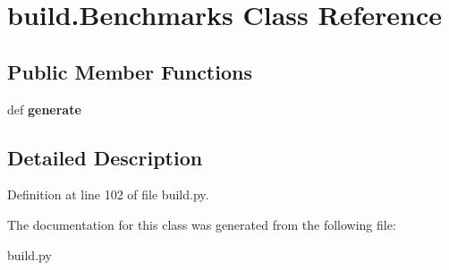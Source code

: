 \hypertarget{classbuild_1_1Benchmarks}{\section{build.\-Benchmarks \-Class \-Reference}
\label{classbuild_1_1Benchmarks}
}
\subsection*{\-Public \-Member \-Functions}
\begin{DoxyCompactItemize}
\item 
\hypertarget{classbuild_1_1Benchmarks_a90444b5ee86805be3194ec86e41ee0a9}{def {\bfseries generate}}\label{classbuild_1_1Benchmarks_a90444b5ee86805be3194ec86e41ee0a9}

\end{DoxyCompactItemize}


\subsection{\-Detailed \-Description}


\-Definition at line 102 of file build.\-py.



\-The documentation for this class was generated from the following file\-:\begin{DoxyCompactItemize}
\item 
build.\-py\end{DoxyCompactItemize}
